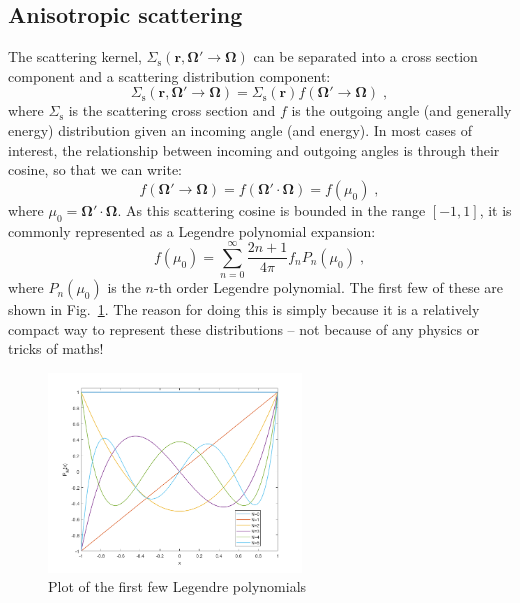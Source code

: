 \documentclass{article}
\begin{document}
\subsection{Anisotropic scattering}

The scattering kernel, $\Sigma_\mathrm{s}\left(\mathbf{r},\mathbf{\Omega}'\rightarrow\mathbf{\Omega}\right)$ can be separated into a cross section component and a scattering distribution component:
\begin{equation}
\Sigma_\mathrm{s}\left(\mathbf{r},\mathbf{\Omega}'\rightarrow\mathbf{\Omega}\right) = \Sigma_\mathrm{s}(\mathbf{r})f(\mathbf{\Omega}'\rightarrow\mathbf{\Omega})\;\mathrm{,}
\end{equation}
where $\Sigma_\mathrm{s}$ is the scattering cross section and $f$ is the outgoing angle (and generally energy) distribution given an incoming angle (and energy). In most cases of interest, the relationship between incoming and outgoing angles is through their cosine, so that we can write:
\begin{equation}
f(\mathbf{\Omega}'\rightarrow\mathbf{\Omega}) = f(\mathbf{\Omega}'\cdot\mathbf{\Omega})=f(\mu_0)\;\mathrm{,}
\end{equation}
where $\mu_0=\mathbf{\Omega}'\cdot\mathbf{\Omega}$. As this scattering cosine is bounded in the range $[-1,1]$, it is commonly represented as a Legendre polynomial expansion:
\begin{equation}\label{eq:legendre_expansion}
    f(\mu_0) = \sum^\infty_{n=0}\frac{2n+1}{4\pi}f_n P_n(\mu_0)\;\mathrm{,}
\end{equation}
where $P_n(\mu_0)$ is the $n$-th order Legendre polynomial. The first few of these are shown in Fig.~\ref{fig:legendre}. The reason for doing this is simply because it is a relatively compact way to represent these distributions -- not because of any physics or tricks of maths!

\begin{figure}
    \centering
    \includegraphics[width=0.6\textwidth]{legendre.png}
    \caption{Plot of the first few Legendre polynomials}
    \label{fig:legendre}
\end{figure}
\end{document}
